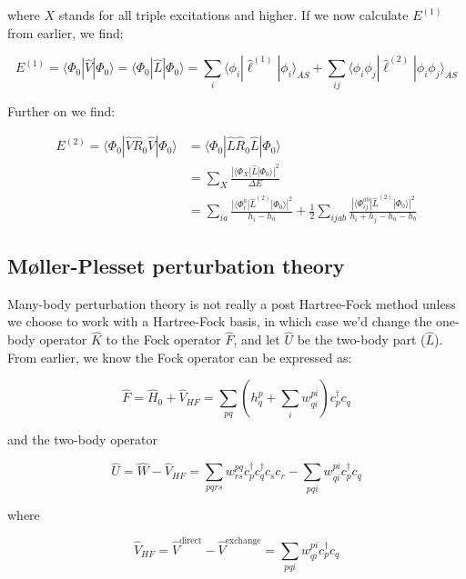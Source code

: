\documentclass[10pt]{report}
\begin{document}
	where $X$ stands for all triple excitations and higher. If we now calculate $E^{(1)}$ from earlier, we find:
	
	\begin{equation}
		E^{(1)} = \langle\Phi_0|\hat{V}|\Phi_0\rangle = \langle\Phi_0|\hat{L}|\Phi_0\rangle = \sum_{i}\langle\phi_i|\hat{\ell}^{(1)}|\phi_i\rangle_{AS} + \sum_{ij}\langle\phi_i\phi_j|\hat{\ell}^{(2)}|\phi_i\phi_j\rangle_{AS}
	\end{equation}
	
	Further on we find:
	
	\begin{align}
		E^{(2)} = \langle\Phi_0|\hat{V}\hat{R}_0\hat{V}|\Phi_0\rangle &= \langle\Phi_0|\hat{L}\hat{R}_0\hat{L}|\Phi_0\rangle \\
		&= \sum_{X}\frac{|\langle\Phi_X|\hat{L}|\Phi_0\rangle|^2}{\Delta E} \\
		&= \sum_{ia}\frac{|\langle\Phi_i^a|\hat{L}^{(2)}|\Phi_0\rangle|^2}{h_i-h_a} + \frac{1}{2}\sum_{ijab}\frac{|\langle\Phi_{ij}^{ab}|\hat{L}^{(2)}|\Phi_0\rangle|^2}{h_i+h_j-h_a-h_b}
	\end{align}
	
	\subsection{M\o ller-Plesset perturbation theory}
	Many-body perturbation theory is not really a post Hartree-Fock method unless we choose to work with a Hartree-Fock basis, in which case we'd change the one-body operator $\hat{K}$ to the Fock operator $\hat{F}$, and let $\hat{U}$ be the two-body part ($\hat{L}$). From earlier, we know the Fock operator can be expressed as:
	
	\begin{equation}
		\hat{F} = \hat{H}_0 + \hat{V}_{HF} = \sum_{pq}\left(h_q^p + \sum_i w_{qi}^{pi}\right)c_p^\dagger c_q
	\end{equation}
	
	and the two-body operator
	
	\begin{equation}
		\hat{U} = \hat{W} - \hat{V}_{HF} = \sum_{pqrs}w_{rs}^{pq} c_p^\dagger c_q^\dagger c_s c_r - \sum_{pqi}w_{qi}^{pi}c_p^\dagger c_q
	\end{equation}
	
	where
	
	\begin{equation}
		\hat{V}_{HF} = \hat{V}^{\text{direct}} - \hat{V}^{\text{exchange}} = \sum_{pqi}w_{qi}^{pi}c_p^\dagger c_q
	\end{equation}
	
\end{document}
